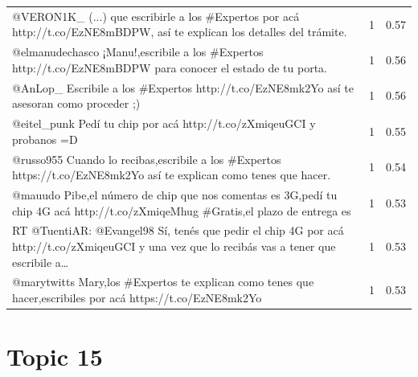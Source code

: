 \begin{longtable}{p{12.5cm}rr}
@VERON1K\_ (...)  que escribirle a los \#Expertos por acá http://t.co/EzNE8mBDPW, así te explican los detalles del trámite. & 1 & 0.57 \\
@elmanudechasco ¡Manu!,escribile a los \#Expertos http://t.co/EzNE8mBDPW para conocer el estado de tu porta. & 1 & 0.56 \\
@AnLop\_ Escribile a los \#Expertos http://t.co/EzNE8mk2Yo así te asesoran como proceder ;) & 1 & 0.56 \\
@eitel\_punk Pedí tu chip por acá http://t.co/zXmiqeuGCI y probanos =D & 1 & 0.55 \\
@russo955 Cuando lo recibas,escribile a los \#Expertos https://t.co/EzNE8mk2Yo así te explican como tenes que hacer. & 1 & 0.54 \\
@mauudo Pibe,el número de chip que nos comentas es 3G,pedí tu chip 4G acá http://t.co/zXmiqeMhug \#Gratis,el plazo de entrega es & 1 & 0.53 \\
RT @TuentiAR: @Evangel98 Sí, tenés que pedir el chip 4G por acá http://t.co/zXmiqeuGCI y una vez que lo recibás vas a tener que escribile a… & 1 & 0.53 \\
@marytwitts Mary,los \#Expertos te explican como tenes que hacer,escribiles por acá https://t.co/EzNE8mk2Yo & 1 & 0.53 \\

\end{longtable}
\clearpage

\section{Topic 15}

